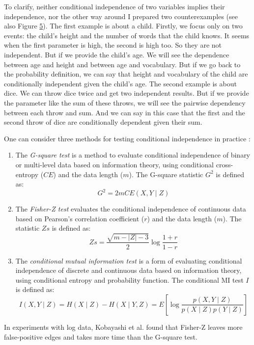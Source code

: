 To clarify, neither conditional independence of two variables implies their independence, nor the other way around I prepared two counterexamples (see also Figure \hyperref[fig:ci-example]{5}). The first example is about a child. Firstly, we focus only on two events: the child's height and the number of words that the child knows. It seems when the first parameter is high, the second is high too. So they are not independent. But if we provide the child's age. We will see the dependence between age and height and between age and vocabulary. But if we go back to the probability definition, we can say that height and vocabulary of the child are conditionally independent given the child's age. The second example is about dice. We can throw dice twice and get two independent results. But if we provide the parameter like the sum of these throws, we will see the pairwise dependency between each throw and sum. And we can say in this case that the first and the second throw of dice are conditionally dependent given their sum. \newline

One can consider three methods for testing conditional independence in practice \cite{kobayashi2017mining}:
\begin{enumerate}
\item The \textit{G-square test} is a method to evaluate conditional independence of binary or multi-level data based on information theory, using conditional cross-entropy ($CE$) and the data length ($m$). The G-square statistic $G^2$ is defined as:
\begin{equation}
G^{2}=2 m C E(X, Y \mid Z)
\end{equation}
\item The \textit{Fisher-Z test} evaluates the conditional independence of continuous data based on Pearson’s correlation coefficient ($r$) and the data length ($m$). The statistic $Zs$ is defined as:
\begin{equation}
Z s=\frac{\sqrt{m-|Z|-3}}{2} \log \frac{1+r}{1-r}
\end{equation}
\item The \textit{conditional mutual information test} is a form of evaluating conditional independence of discrete and continuous data based on information theory, using conditional entropy and probability function. The conditional MI test $I$ is defined as:
\begin{equation}
I(X , Y \mid Z)=H(X \mid Z)-H(X \mid Y, Z)=E\left[\log \frac{p(X, Y \mid Z)}{p(X \mid Z) p(Y \mid Z)}\right]
\end{equation}
\end{enumerate}
In experiments with log data, Kobayashi et al. \cite{kobayashi2017mining} found that Fisher-Z leaves more false-positive edges and takes more time than the G-square test. \newline


